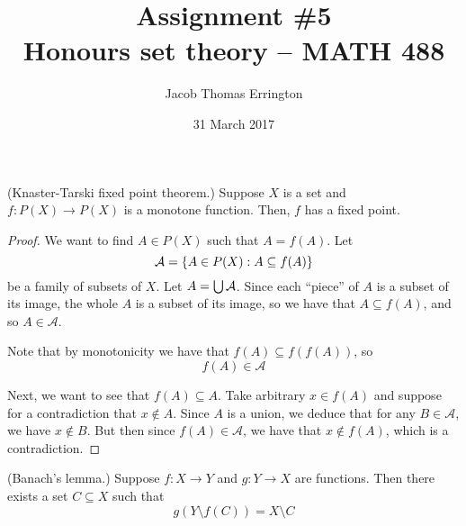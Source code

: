 \documentclass[11pt]{article}
\author{Jacob Thomas Errington}
\title{Assignment \#5\\Honours set theory -- MATH 488}
\date{31 March 2017}
\begin{document}
\maketitle

\begin{prop}{(Knaster-Tarski fixed point theorem.)}
    Suppose $X$ is a set and $f : P(X) \to P(X)$ is a monotone function.
    Then, $f$ has a fixed point.
\end{prop}

\begin{proof}
    We want to find $A \in P(X)$ such that $A = f(A)$.
    Let
    \begin{equation*}
        \mathcal{A} = \left\{ A \in P(X) : A \subseteq f(A) \right\}
    \end{equation*}
    be a family of subsets of $X$. Let $A = \bigcup \mathcal{A}$.
    Since each ``piece'' of $A$ is a subset of its image, the whole $A$ is a
    subset of its image, so we have that $A \subseteq f(A)$, and so
    $A \in \mathcal{A}$.

    Note that by monotonicity we have that $f(A) \subseteq f(f(A))$, so
    \begin{equation}
        \label{eq:rekt}
        f(A) \in \mathcal{A}
    \end{equation}

    Next, we want to see that $f(A) \subseteq A$.
    Take arbitrary $x \in f(A)$
    and suppose for a contradiction that $x \notin A$.
    Since $A$ is a union,
    we deduce that for any $B \in \mathcal{A}$,
    we have $x \notin B$.
    But then since $f(A) \in \mathcal{A}$, we have that $x \notin f(A)$, which
    is a contradiction.
\end{proof}

\begin{prop}{(Banach's lemma.)}
    Suppose $f : X \to Y$ and $g : Y \to X$ are functions.
    Then there exists a set $C \subseteq X$ such that
    \begin{equation}
        \label{eq:wts-2}
        g(Y \setminus f(C)) = X \setminus C
    \end{equation}
\end{prop}
\end{document}
